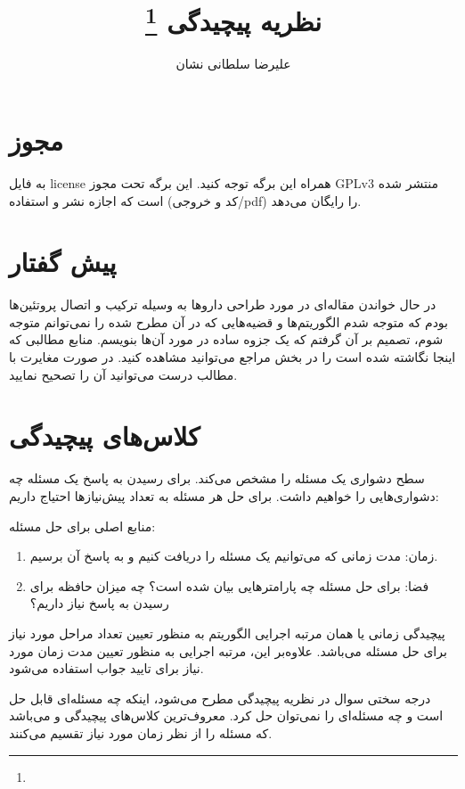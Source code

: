 \documentclass[a4paper]{article}
\title{نظریه پیچیدگی \footnote{\lr{Computational complexity theory}}}
\author{علیرضا سلطانی نشان}
\begin{document}
\maketitle
\tableofcontents

\section{مجوز}

به فایل license همراه این برگه توجه کنید. این برگه تحت مجوز GPLv3 منتشر شده است
که اجازه نشر و استفاده (کد و خروجی/pdf) را رایگان می‌دهد.

\section{پیش گفتار}

در حال خواندن مقاله‌ای در مورد طراحی دارو‌ها به وسیله ترکیب و اتصال پروتئین‌ها
بودم که متوجه شدم الگوریتم‌ها و قضیه‌هایی که در آن مطرح شده را نمی‌توانم متوجه
شوم، تصمیم بر آن گرفتم که یک جزوه ساده در مورد آن‌ها بنویسم. منابع مطالبی که
اینجا نگاشته شده است را در بخش مراجع می‌توانید مشاهده کنید. در صورت مغایرت با
مطالب درست می‌توانید آن را تصحیح نمایید.

\section{کلاس‌های پیچیدگی}

سطح دشواری یک مسئله را مشخص می‌کند. برای رسیدن به پاسخ یک مسئله چه دشواری‌هایی
را خواهیم داشت. برای حل هر مسئله به تعداد پیش‌نیاز‌ها احتیاج داریم:

منابع اصلی برای حل مسئله:

\begin{enumerate}
    \item زمان: مدت زمانی که می‌توانیم یک مسئله را دریافت کنیم و به پاسخ آن
    برسیم.
    \item فضا: برای حل مسئله چه پارامتر‌هایی بیان شده است؟ چه میزان حافظه برای
    رسیدن به پاسخ نیاز داریم؟
\end{enumerate}

پیچیدگی زمانی یا همان مرتبه اجرایی الگوریتم به منظور تعیین تعداد مراحل مورد نیاز
برای حل مسئله می‌باشد. علاوه‌بر این، مرتبه اجرایی به منظور تعیین مدت زمان مورد
نیاز برای تایید جواب استفاده می‌شود.

درجه سختی سوال در نظریه پیچیدگی مطرح می‌شود، اینکه چه مسئله‌ای قابل حل است و چه
مسئله‌ای را نمی‌توان حل کرد. معروف‌ترین کلاس‌های پیچیدگی  و 
می‌باشد که مسئله را از نظر زمان مورد نیاز تقسیم می‌کنند.
\end{document}
